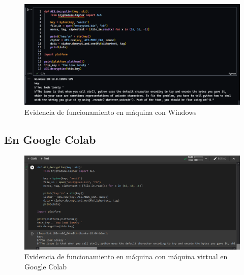 \documentclass{article}
\begin{document}
            \begin{figure}[!h]
                \centering
                \includegraphics[scale=0.5]{img/windows-evidence.png}
                \caption{Evidencia de funcionamiento en máquina con Windows}
                \label{fig:windows}
            \end{figure}

        \subsection{En Google Colab}
        
            \begin{figure}[!h]
                \centering
                \includegraphics[scale=0.5]{img/colab-evidence.png}
                \caption{Evidencia de funcionamiento en máquina con máquina virtual en Google Colab}
                \label{fig:colab}
            \end{figure}
    
    
    
\end{document}
